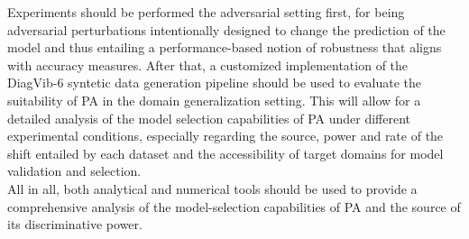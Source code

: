 Experiments should be performed the adversarial setting first, for being adversarial perturbations
intentionally designed to change the prediction of the model and thus entailing a performance-based notion of
robustness that aligns with accuracy measures. After that, a customized implementation of 
the DiagVib-6 
\cite{euligDiagViB6DiagnosticBenchmark2021} 
syntetic data generation pipeline should be used to evaluate the suitability of PA in the domain
generalization setting. This will allow for a detailed analysis of the model selection capabilities of PA 
under different experimental conditions, especially regarding the source, power and rate of the shift 
entailed by each dataset and the accessibility of target domains for model validation and selection.\\


All in all, both analytical and numerical tools should be used to provide a comprehensive analysis
of the model-selection capabilities of PA and the source of its discriminative power. \\




